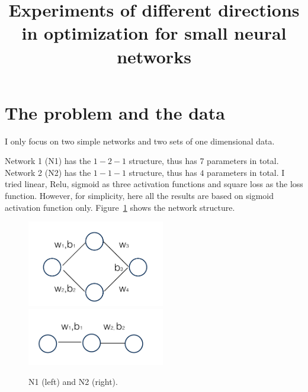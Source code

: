 \documentclass[12pt]{article}
\begin{document}
 
 
 
\title{Experiments of different directions in optimization for small neural networks}%
\date{\vspace{-10ex}}
\maketitle
 

\section{The problem and the data}


I only focus on two simple networks and two sets of one dimensional data.


Network 1 (N1) has the $1-2-1$ structure, thus has 7 parameters in total. Network 2 (N2) has the $1-1-1$ structure, thus has $4$ parameters in total. I tried linear, Relu, sigmoid as three activation functions and square loss as the loss function. However, for simplicity, here all the results are based on sigmoid activation function only. Figure~\ref{fig:n} shows the network structure.
\begin{figure}[h]
\centering
\includegraphics[width=6cm]{n1}
\includegraphics[width=6cm]{n2}
\caption{N1 (left) and N2 (right).}
\label{fig:n}
\end{figure}
\end{document}
